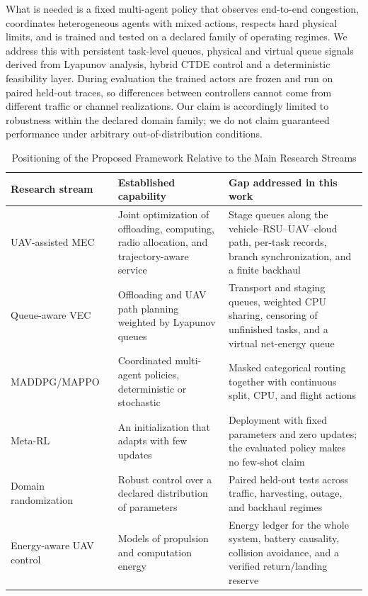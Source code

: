 What is needed is a fixed multi-agent policy that observes end-to-end
congestion, coordinates heterogeneous agents with mixed actions, respects hard
physical limits, and is trained and tested on a declared family of operating
regimes. We address this with persistent task-level queues, physical and
virtual queue signals derived from Lyapunov analysis, hybrid CTDE control and
a deterministic feasibility layer. During evaluation the trained actors are
frozen and run on paired held-out traces, so differences between controllers
cannot come from different traffic or channel realizations. Our claim is
accordingly limited to robustness within the declared domain family; we do
not claim guaranteed performance under arbitrary out-of-distribution
conditions.

\begin{table}[!t]
\caption{Positioning of the Proposed Framework Relative to the Main Research Streams}
\label{tab:positioning}
\centering
\footnotesize
\begin{tabular}{p{}p{}p{}}
\toprule
Research stream & Established capability & Gap addressed in this work\\
\midrule
UAV-assisted MEC~\cite{liu2020uav,xiong2021energy,guo2024multi} & Joint optimization of offloading, computing, radio allocation, and trajectory-aware service & Stage queues along the vehicle--RSU--UAV--cloud path, per-task records, branch synchronization, and a finite backhaul\\
Queue-aware VEC~\cite{neely2010stochastic,mao2017dynamic,sun2026qtop} & Offloading and UAV path planning weighted by Lyapunov queues & Transport and staging queues, weighted CPU sharing, censoring of unfinished tasks, and a virtual net-energy queue\\
MADDPG/MAPPO~\cite{lowe2017multi,schulman2017proximal,talukdar2026mappo} & Coordinated multi-agent policies, deterministic or stochastic & Masked categorical routing together with continuous split, CPU, and flight actions\\
Meta-RL~\cite{finn2017model,nichol2018reptile,yan2026rmaddpg} & An initialization that adapts with few updates & Deployment with fixed parameters and zero updates; the evaluated policy makes no few-shot claim\\
Domain randomization~\cite{tobin2017domain,peng2018sim} & Robust control over a declared distribution of parameters & Paired held-out tests across traffic, harvesting, outage, and backhaul regimes\\
Energy-aware UAV control~\cite{liu2020uav,talukdar2026mappo,zhang2019predictive} & Models of propulsion and computation energy & Energy ledger for the whole system, battery causality, collision avoidance, and a verified return/landing reserve\\
\bottomrule
\end{tabular}
\end{table}
